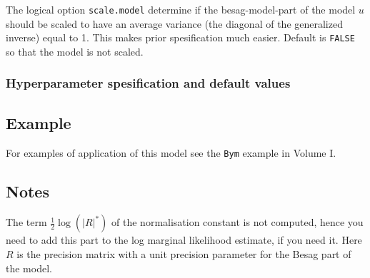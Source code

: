 \documentclass[a4paper,11pt]{article}
\begin{document}
The logical option \verb|scale.model| determine if the
besag-model-part of the model $u$ should be scaled to have an average
variance (the diagonal of the generalized inverse) equal to 1. This
makes prior spesification much easier. Default is \verb|FALSE| so that
the model is not scaled.


\subsubsection*{Hyperparameter spesification and default values}



\subsection*{Example}

For examples of application of this model see the {\tt Bym} example in
Volume I.



\subsection*{Notes}

The term $\frac{1}{2}\log(|R|^{*})$ of the normalisation constant is
not computed, hence you need to add this part to the log marginal
likelihood estimate, if you need it. Here $R$ is the precision matrix
with a unit precision parameter for the Besag part of the model.
\end{document}
